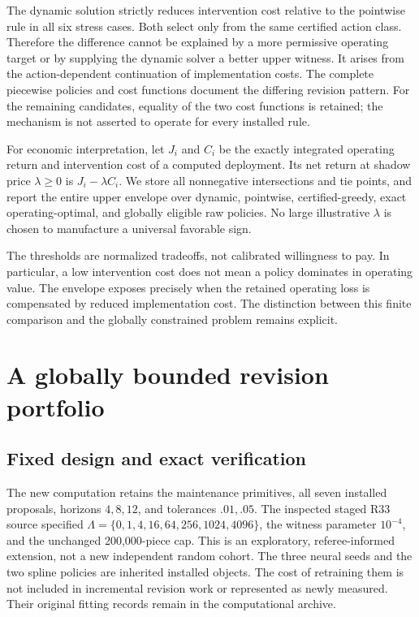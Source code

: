 The dynamic solution strictly reduces intervention cost relative to the pointwise rule in all six stress cases. Both select only from the same certified action class. Therefore the difference cannot be explained by a more permissive operating target or by supplying the dynamic solver a better upper witness. It arises from the action-dependent continuation of implementation costs. The complete piecewise policies and cost functions document the differing revision pattern. For the remaining candidates, equality of the two cost functions is retained; the mechanism is not asserted to operate for every installed rule.

For economic interpretation, let $J_i$ and $C_i$ be the exactly integrated operating return and intervention cost of a computed deployment. Its net return at shadow price $\lambda\ge0$ is $J_i-\lambda C_i$. We store all nonnegative intersections and tie points, and report the entire upper envelope over dynamic, pointwise, certified-greedy, exact operating-optimal, and globally eligible raw policies. No large illustrative $\lambda$ is chosen to manufacture a universal favorable sign.

The thresholds are normalized tradeoffs, not calibrated willingness to pay. In particular, a low intervention cost does not mean a policy dominates in operating value. The envelope exposes precisely when the retained operating loss is compensated by reduced implementation cost. The distinction between this finite comparison and the globally constrained problem remains explicit.

\section{A globally bounded revision portfolio}\label{sec:global-results}
\subsection{Fixed design and exact verification}
The new computation retains the maintenance primitives, all seven installed proposals, horizons $4,8,12$, and tolerances $.01,.05$. The inspected staged R33 source specified
$\Lambda=\{0,1,4,16,64,256,1024,4096\}$,
the witness parameter $10^{-4}$, and the unchanged 200,000-piece cap. This is an exploratory, referee-informed extension, not a new independent random cohort. The three neural seeds and the two spline policies are inherited installed objects. The cost of retraining them is not included in incremental revision work or represented as newly measured. Their original fitting records remain in the computational archive.

